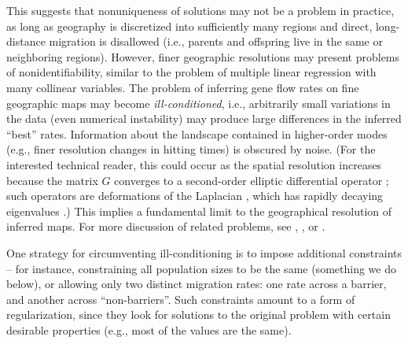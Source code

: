 \documentclass{article}
\begin{document}
This suggests that nonuniqueness of solutions may not be a problem in practice,
as long as geography is discretized into sufficiently many regions
and direct, long-distance migration is disallowed 
(i.e., parents and offspring live in the same or neighboring regions).
However, finer geographic resolutions may present problems of nonidentifiability, 
similar to the problem of multiple linear regression with many collinear variables.
The problem of inferring gene flow rates on fine geographic maps may become \emph{ill-conditioned},
i.e., arbitrarily small variations in the data
(even numerical instability)
may produce large differences in the inferred ``best'' rates.
Information about the landscape contained in higher-order modes
(e.g., finer resolution changes in hitting times)
is obscured by noise.
(For the interested technical reader, 
this could occur as the spatial resolution increases because
the matrix $G$ converges to a second-order elliptic differential operator \citep{stroock1997multidimensional};
such operators are deformations of the Laplacian \citep{feller4},
which has rapidly decaying eigenvalues \citep{hpmckean1967curvature,kuttler1984eigenvalues}.)
This implies a fundamental limit to the geographical resolution of inferred maps.
For more discussion of related problems, see 
\citet{epstein2008badtruth}, \citet{myers2008learn}, or \citet{terhorst2015fundamental}.

One strategy for circumventing ill-conditioning is to impose additional constraints --
for instance, constraining all population sizes to be the same (something we do below),
or allowing only two distinct migration rates: one rate across a barrier, 
and another across ``non-barriers''.
Such constraints amount to a form of regularization,
since they look for solutions to the original problem with certain desirable properties
(e.g., most of the values are the same). 
\end{document}
